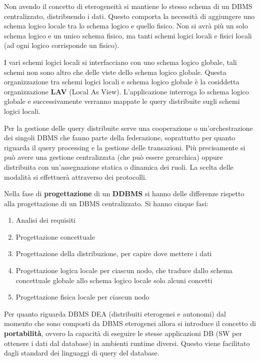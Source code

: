 Non avendo il concetto di eterogeneità si mantiene lo stesso schema di un DBMS
centralizzato, distribuendo i dati. Questo comporta la necessità di aggiungere
uno schema logico locale tra lo schema logico e quello fisico. Non si avrà più
un solo schema logico e un unico schema fisico, ma tanti schemi logici locali e
fisici locali (ad ogni logico corrisponde un fisico).

I vari schemi logici locali si interfacciano con uno schema logico globale,
tali schemi non sono altro che delle viste dello schema logico globale. Questa
organizzazione tra schemi logici locali e schema logico globale è la cosiddetta
organizzazione \textbf{LAV} (Local As View). L'applicazione interroga
lo schema logico globale e successivamente verranno mappate le query distribuite 
sugli schemi logici locali.


Per la gestione delle query distribuite serve una cooperazione o un'orchestrazione
dei singoli DBMS che fanno parte della federazione, soprattutto per quanto riguarda
il query processing e la gestione delle transazioni. Più precisamente si può avere
una gestione centralizzata (che può essere gerarchica) oppure distribuita con
un'assegnazione statica o dinamica dei ruoli. La scelta delle modalità
si effettuerà attraverso dei protocolli.

Nella fase di \textbf{progettazione} di un \textbf{DDBMS} si hanno delle
differenze rispetto alla progettazione di un DBMS centralizzato. Si hanno cinque fasi:
\begin{enumerate}
      \item Analisi dei requisiti
      \item Progettazione concettuale
      \item Progettazione della distribuzione, per capire dove mettere i dati
      \item Progettazione logica locale per ciascun nodo, che traduce dallo schema
            concettuale globale allo schema logico locale solo alcuni concetti
      \item Progettazione fisica locale per ciascun nodo
\end{enumerate}
Per quanto riguarda DBMS DEA (distribuiti eterogenei e autonomi) dal momento che
sono composti da DBMS eterogenei allora si introduce il concetto di \textbf{portabilità},
ovvero la capacità di eseguire le stesse applicazioni DB (SW per ottenere i dati
dal database) in ambienti runtime diversi. Questo viene facilitato dagli standard
dei linguaggi di query del database.

